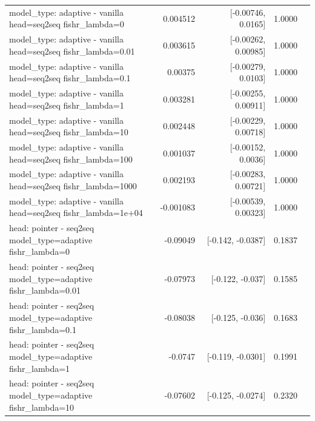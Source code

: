 \documentclass[10pt]{article}
\makeatletter
\newcommand{\stackcell}[1]{\begin{tabular}[t]{@{}l@{}}#1\end{tabular}}
\makeatother
\begin{document}
{\begin{longtable}{lrrrl}
\stackcell{model\_type: adaptive - vanilla\\\footnotesize head=seq2seq fishr\_lambda=0 } & 0.004512 & [-0.00746, 0.0165] & 1.0000 & \\
\stackcell{model\_type: adaptive - vanilla\\\footnotesize head=seq2seq fishr\_lambda=0.01 } & 0.003615 & [-0.00262, 0.00985] & 1.0000 & \\
\stackcell{model\_type: adaptive - vanilla\\\footnotesize head=seq2seq fishr\_lambda=0.1 } & 0.00375 & [-0.00279, 0.0103] & 1.0000 & \\
\stackcell{model\_type: adaptive - vanilla\\\footnotesize head=seq2seq fishr\_lambda=1 } & 0.003281 & [-0.00255, 0.00911] & 1.0000 & \\
\stackcell{model\_type: adaptive - vanilla\\\footnotesize head=seq2seq fishr\_lambda=10 } & 0.002448 & [-0.00229, 0.00718] & 1.0000 & \\
\stackcell{model\_type: adaptive - vanilla\\\footnotesize head=seq2seq fishr\_lambda=100 } & 0.001037 & [-0.00152, 0.0036] & 1.0000 & \\
\stackcell{model\_type: adaptive - vanilla\\\footnotesize head=seq2seq fishr\_lambda=1000 } & 0.002193 & [-0.00283, 0.00721] & 1.0000 & \\
\stackcell{model\_type: adaptive - vanilla\\\footnotesize head=seq2seq fishr\_lambda=1e+04 } & -0.001083 & [-0.00539, 0.00323] & 1.0000 & \\
\stackcell{head: pointer - seq2seq\\\footnotesize model\_type=adaptive fishr\_lambda=0 } & -0.09049 & [-0.142, -0.0387] & 0.1837 & \\
\stackcell{head: pointer - seq2seq\\\footnotesize model\_type=adaptive fishr\_lambda=0.01 } & -0.07973 & [-0.122, -0.037] & 0.1585 & \\
\stackcell{head: pointer - seq2seq\\\footnotesize model\_type=adaptive fishr\_lambda=0.1 } & -0.08038 & [-0.125, -0.036] & 0.1683 & \\
\stackcell{head: pointer - seq2seq\\\footnotesize model\_type=adaptive fishr\_lambda=1 } & -0.0747 & [-0.119, -0.0301] & 0.1991 & \\
\stackcell{head: pointer - seq2seq\\\footnotesize model\_type=adaptive fishr\_lambda=10 } & -0.07602 & [-0.125, -0.0274] & 0.2320 & \\

\end{longtable}}
\end{document}
